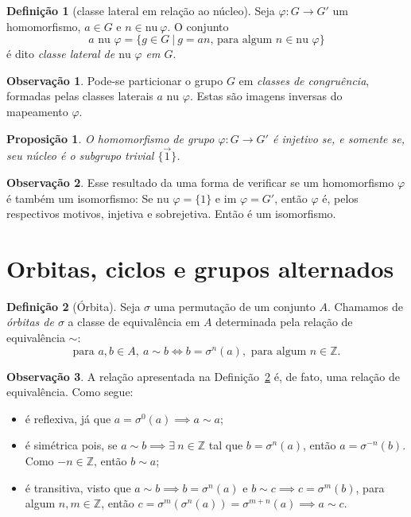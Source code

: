 \documentclass[a4paper,12pt]{report}
\theoremstyle{plain}
\newtheorem{proposicao}{Proposição}[section]
\theoremstyle{definition}
\newtheorem{definicao}{Definição}[section]
\newtheorem{observacao}{Observação}[section]
\begin{document}
\begin{definicao}[classe lateral em relação ao núcleo]
	Seja \(\varphi: G\longrightarrow G'\) um
	homomorfismo, \(a \in G\) e \(n\in\text{nu}\ \varphi\). O conjunto
	\[a\text{ nu }\varphi = \{g\in G \ | \ g = an \text{, para algum } n\in\text{nu }\varphi\}\] é dito \emph{classe lateral de \(\text{nu }\varphi\) em \(G\)}.	
\end{definicao}

\begin{observacao}
	Pode-se particionar o grupo \(G\) em \emph{classes de congruência},
	formadas pelas classes laterais \(a\text{ nu }\varphi\). Estas são imagens
	inversas do mapeamento \(\varphi\).
\end{observacao}

\begin{proposicao}
	O homomorfismo de grupo
	\(\varphi: G\longrightarrow G'\) é injetivo se, e somente se, seu núcleo
	é o subgrupo trivial \(\{\vec 1\}\).
\end{proposicao}

\begin{observacao}
	Esse resultado da uma forma de verificar se um homomorfismo \(\varphi\)
	é também um isomorfismo: Se \(\text{nu }\varphi = \{1\}\) e
	\(\text{im } \varphi = G'\), então \(\varphi\) é, pelos respectivos
	motivos, injetiva e sobrejetiva. Então é um isomorfismo.
\end{observacao}

\section{Orbitas, ciclos e grupos alternados}

\begin{definicao}[Órbita]\label{def:orbit}
	Seja $\sigma$ uma permutação de um conjunto $A$. Chamamos de \emph{órbitas de $\sigma$} a classe de equivalência em $A$ determinada pela relação de equivalência $\sim$:
	$$\text{para }a,b \in A,\ a\sim b \iff b=\sigma^n(a), \text{ para algum }n\in\mathbb{Z}.$$
\end{definicao}

\begin{observacao}
	A relação apresentada na Definição~\ref{def:orbit} é, de fato, uma relação de equivalência. Como segue:
	\begin{itemize}
		\item é reflexiva, já que $a = \sigma^0(a) \implies a\sim a$;
		\item é simétrica pois, se $a\sim b \implies \exists\  n\in \mathbb{Z}$ tal que $b = \sigma^n(a)$, então $a = \sigma^{-n}(b)$. Como $-n\in\mathbb{Z}$, então $b\sim a$;
		\item é transitiva, visto que $a\sim b \implies b=\sigma^n(a)$ e $b \sim c \implies c = \sigma^m(b)$, para algum $n,m\in\mathbb{Z}$, então $c=\sigma^m(\sigma^n(a)) = \sigma^{m+n}(a) \implies a\sim c$.
	\end{itemize}
\end{observacao}
\end{document}
